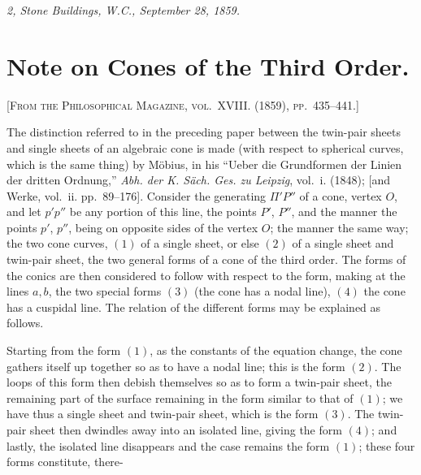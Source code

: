 \documentclass[11pt,a4paper]{article}
\begin{document}
\smallskip
\noindent\textit{2, Stone Buildings, W.C., September 28, 1859.}

\newpage


\setcounter{page}{120}

\section*{Note on Cones of the Third Order.}
\label{paper:249}

\textsc{[From the Philosophical Magazine, vol.~XVIII. (1859), pp.~435--441.]}

\medskip

The distinction referred to in the preceding paper between the twin-pair sheets and single sheets of an algebraic cone is made (with respect to spherical curves, which is the same thing) by Möbius, in his ``Ueber die Grundformen der Linien der dritten Ordnung,'' \textit{Abh. der K. Säch. Ges. zu Leipzig}, vol.~i. (1848); [and Werke, vol.~ii. pp.~89--176]. Consider the generating $\Pi'P''$ of a cone, vertex $O$, and let $p'p''$ be any portion of this line, the points $P'$, $P''$, and the manner the points $p'$, $p''$, being on opposite sides of the vertex $O$; the manner the same way; the two cone curves, $(1)$ of a single sheet, or else $(2)$ of a single sheet and twin-pair sheet, the two general forms of a cone of the third order. The forms of the conics are then considered to follow with respect to the form, making at the lines $a, b$, the two special forms $(3)$ (the cone has a nodal line), $(4)$ the cone has a cuspidal line. The relation of the different forms may be explained as follows.

Starting from the form $(1)$, as the constants of the equation change, the cone gathers itself up together so as to have a nodal line; this is the form $(2)$. The loops of this form then debish themselves so as to form a twin-pair sheet, the remaining part of the surface remaining in the form similar to that of $(1)$; we have thus a single sheet and twin-pair sheet, which is the form $(3)$. The twin-pair sheet then dwindles away into an isolated line, giving the form $(4)$; and lastly, the isolated line disappears and the case remains the form $(1)$; these four forms constitute, there-
\end{document}
